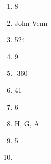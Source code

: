 \documentclass[../uilmath.tex]{subfiles}
\begin{document}
\begin{enumerate}[label=\bfseries\arabic*.]
    \item %
    8

    \item %
    John Venn 

    \item %
    524

    \item %
    9

    \item %
    -360

    \item %
    41

    \item %
    6

    \item %
    H, G, A 

    \item %
    5

    \item %
    
\end{enumerate}
\end{document}
